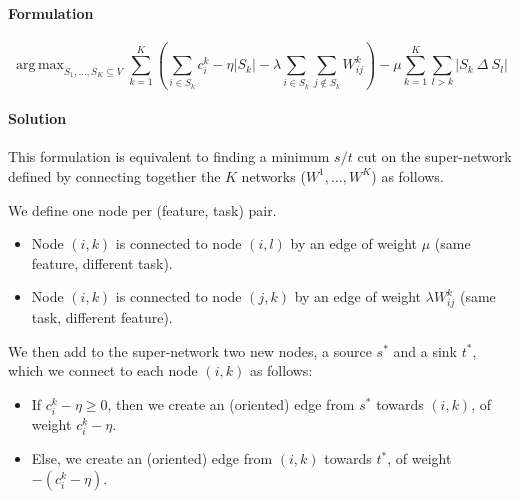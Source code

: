 \documentclass[12pt,a4paper]{article}
\newcommand{\sset}{S}
\newcommand{\vset}{V}
\DeclareMathOperator*{\argmax}{arg\,max}
\begin{document}


\paragraph{Formulation}
\begin{equation}
\argmax_{\sset_1, \dots, \sset_K \subseteq \vset }  \sum_{k=1}^K \left (
\sum_{i \in \sset_k} c_i^k - \eta |\sset_k| - 
\lambda \sum_{i \in \sset_k} \sum_{j \notin \sset_k} W_{ij}^k \right ) - 
\mu  \sum_{k=1}^K \sum_{l > k} |\sset_{k} ~\Delta~ \sset_{l}|
\label{eq:multi_scones}
\end{equation}


\paragraph{Solution} 
This formulation is equivalent to finding a minimum $s/t$ cut on the super-network defined by connecting together the $K$ networks ($W^1, \dots, W^K$) as follows.

We define one node per (feature, task) pair.
\begin{itemize}
\item Node $(i, k)$ is connected to node $(i, l)$ 
  by an edge of weight $\mu$ (same feature, different task). 
\item Node $(i, k)$ is connected to node $(j, k)$
  by an edge of weight $\lambda W_{ij}^{k}$ (same task, different feature). 
\end{itemize}

We then add to the super-network two new nodes, a source $s^*$ and a sink $t^*$, 
which we connect to each node $(i, k)$ as follows:
\begin{itemize}
\item If $c_i^k - \eta \geq 0$, then we create an (oriented) edge from $s^*$ towards $(i, k)$,
  of weight $c_i^k - \eta$.
\item Else, we create an (oriented) edge from $(i, k)$ towards $t^*$, of weight $- (c_i^k - \eta)$.
\end{itemize}
\end{document}
